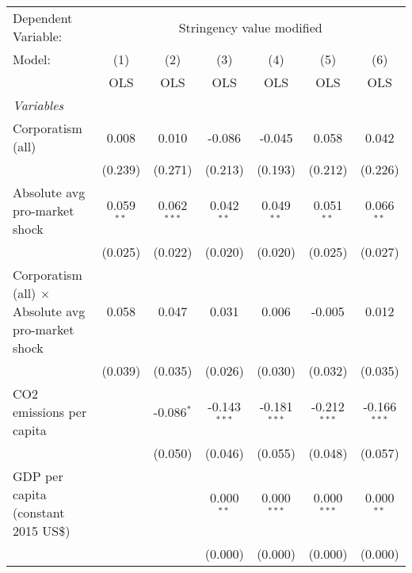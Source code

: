 
\begingroup
\centering
\begin{tabular}{lcccccc}
   \toprule
   Dependent Variable: & \multicolumn{6}{c}{Stringency value modified}\\
   Model:                                                    & (1)          & (2)           & (3)            & (4)            & (5)            & (6)\\  
                                                             &  OLS         & OLS           & OLS            & OLS            & OLS            & OLS\\  
   \midrule
   \emph{Variables}\\
   Corporatism (all)                                         & 0.008        & 0.010         & -0.086         & -0.045         & 0.058          & 0.042\\   
                                                             & (0.239)      & (0.271)       & (0.213)        & (0.193)        & (0.212)        & (0.226)\\   
   Absolute avg pro-market shock                             & 0.059$^{**}$ & 0.062$^{***}$ & 0.042$^{**}$   & 0.049$^{**}$   & 0.051$^{**}$   & 0.066$^{**}$\\   
                                                             & (0.025)      & (0.022)       & (0.020)        & (0.020)        & (0.025)        & (0.027)\\   
   Corporatism (all) $\times$ Absolute avg pro-market shock  & 0.058        & 0.047         & 0.031          & 0.006          & -0.005         & 0.012\\   
                                                             & (0.039)      & (0.035)       & (0.026)        & (0.030)        & (0.032)        & (0.035)\\   
   CO2 emissions per capita                                  &              & -0.086$^{*}$  & -0.143$^{***}$ & -0.181$^{***}$ & -0.212$^{***}$ & -0.166$^{***}$\\   
                                                             &              & (0.050)       & (0.046)        & (0.055)        & (0.048)        & (0.057)\\   
   GDP per capita (constant 2015 US\$)                       &              &               & 0.000$^{**}$   & 0.000$^{***}$  & 0.000$^{***}$  & 0.000$^{**}$\\   
                                                             &              &               & (0.000)        & (0.000)        & (0.000)        & (0.000)\\   

\end{tabular}
